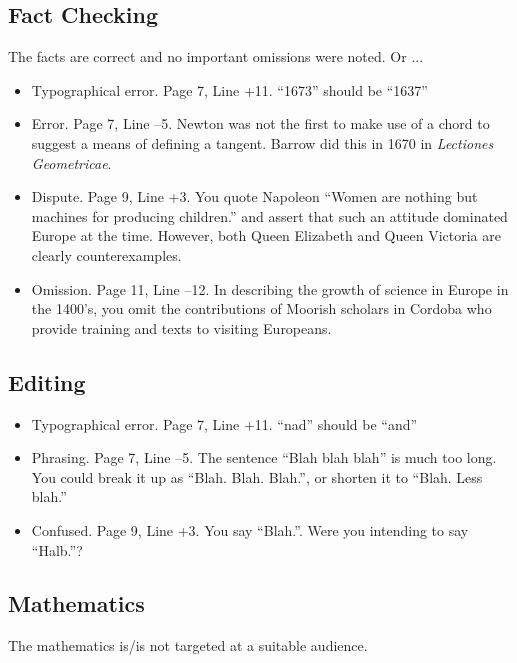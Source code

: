 \documentclass[11pt]{article}
\begin{document}
\subsection*{Fact Checking}
The facts are correct and no important omissions were noted. Or ...
\begin{itemize}
\item Typographical error. Page 7, Line +11. ``1673'' should be ``1637''
\item Error. Page 7, Line --5. Newton was not the first to make use of a chord to suggest a means of defining a tangent. Barrow did this in 1670 in {\em Lectiones Geometricae}.
\item Dispute. Page 9, Line +3. You quote Napoleon ``Women are nothing but machines for producing children.'' and assert that such an attitude dominated Europe at the time. However, both Queen Elizabeth and Queen Victoria are clearly counterexamples.
\item Omission. Page 11, Line --12. In describing the growth of science in Europe in the 1400's, you omit the contributions of Moorish scholars in Cordoba who provide training and texts to visiting Europeans.
\end{itemize}

\subsection*{Editing}

\begin{itemize}
\item Typographical error. Page 7, Line +11. ``nad'' should be ``and''
\item Phrasing. Page 7, Line --5. The sentence ``Blah blah blah'' is much too long. You could break it up as ``Blah. Blah. Blah.'', or shorten it to ``Blah. Less blah.''
\item Confused. Page 9, Line +3. You say ``Blah.''. Were you intending to say ``Halb.''?
\end{itemize}

\subsection*{Mathematics}

The mathematics is/is not targeted at a suitable audience.
\end{document}

